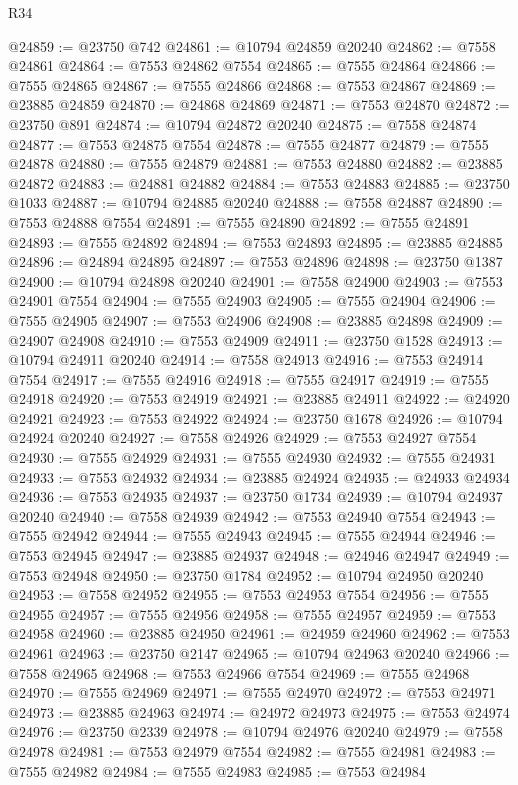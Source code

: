 \begin{lexlean}{R34}
\begin{coremodule}
@24859 := @23750 @742
@24861 := @10794 @24859 @20240
@24862 := @7558 @24861
@24864 := @7553 @24862 @7554
@24865 := @7555 @24864
@24866 := @7555 @24865
@24867 := @7555 @24866
@24868 := @7553 @24867
@24869 := @23885 @24859
@24870 := @24868 @24869
@24871 := @7553 @24870
@24872 := @23750 @891
@24874 := @10794 @24872 @20240
@24875 := @7558 @24874
@24877 := @7553 @24875 @7554
@24878 := @7555 @24877
@24879 := @7555 @24878
@24880 := @7555 @24879
@24881 := @7553 @24880
@24882 := @23885 @24872
@24883 := @24881 @24882
@24884 := @7553 @24883
@24885 := @23750 @1033
@24887 := @10794 @24885 @20240
@24888 := @7558 @24887
@24890 := @7553 @24888 @7554
@24891 := @7555 @24890
@24892 := @7555 @24891
@24893 := @7555 @24892
@24894 := @7553 @24893
@24895 := @23885 @24885
@24896 := @24894 @24895
@24897 := @7553 @24896
@24898 := @23750 @1387
@24900 := @10794 @24898 @20240
@24901 := @7558 @24900
@24903 := @7553 @24901 @7554
@24904 := @7555 @24903
@24905 := @7555 @24904
@24906 := @7555 @24905
@24907 := @7553 @24906
@24908 := @23885 @24898
@24909 := @24907 @24908
@24910 := @7553 @24909
@24911 := @23750 @1528
@24913 := @10794 @24911 @20240
@24914 := @7558 @24913
@24916 := @7553 @24914 @7554
@24917 := @7555 @24916
@24918 := @7555 @24917
@24919 := @7555 @24918
@24920 := @7553 @24919
@24921 := @23885 @24911
@24922 := @24920 @24921
@24923 := @7553 @24922
@24924 := @23750 @1678
@24926 := @10794 @24924 @20240
@24927 := @7558 @24926
@24929 := @7553 @24927 @7554
@24930 := @7555 @24929
@24931 := @7555 @24930
@24932 := @7555 @24931
@24933 := @7553 @24932
@24934 := @23885 @24924
@24935 := @24933 @24934
@24936 := @7553 @24935
@24937 := @23750 @1734
@24939 := @10794 @24937 @20240
@24940 := @7558 @24939
@24942 := @7553 @24940 @7554
@24943 := @7555 @24942
@24944 := @7555 @24943
@24945 := @7555 @24944
@24946 := @7553 @24945
@24947 := @23885 @24937
@24948 := @24946 @24947
@24949 := @7553 @24948
@24950 := @23750 @1784
@24952 := @10794 @24950 @20240
@24953 := @7558 @24952
@24955 := @7553 @24953 @7554
@24956 := @7555 @24955
@24957 := @7555 @24956
@24958 := @7555 @24957
@24959 := @7553 @24958
@24960 := @23885 @24950
@24961 := @24959 @24960
@24962 := @7553 @24961
@24963 := @23750 @2147
@24965 := @10794 @24963 @20240
@24966 := @7558 @24965
@24968 := @7553 @24966 @7554
@24969 := @7555 @24968
@24970 := @7555 @24969
@24971 := @7555 @24970
@24972 := @7553 @24971
@24973 := @23885 @24963
@24974 := @24972 @24973
@24975 := @7553 @24974
@24976 := @23750 @2339
@24978 := @10794 @24976 @20240
@24979 := @7558 @24978
@24981 := @7553 @24979 @7554
@24982 := @7555 @24981
@24983 := @7555 @24982
@24984 := @7555 @24983
@24985 := @7553 @24984

\end{coremodule}
\end{lexlean}
